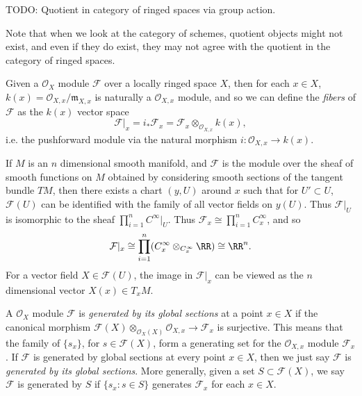 \begin{example}
    TODO: Quotient in category of ringed spaces via group action.
\end{example}

Note that when we look at the category of schemes, quotient objects might not exist, and even if they do exist, they may not agree with the quotient in the category of ringed spaces.

Given a $\mathcal{O}_X$ module $\mathcal{F}$ over a locally ringed space $X$, then for each $x \in X$, $k(x) = \mathcal{O}_{X,x} / \mathfrak{m}_{X,x}$ is naturally a $\mathcal{O}_{X,x}$ module, and so we can define the \emph{fibers} of $\mathcal{F}$ as the $k(x)$ vector space
%
\[ \mathcal{F}|_x = i_* \mathcal{F}_x = \mathcal{F}_x \otimes_{\mathcal{O}_{X,x}} k(x), \]
%
i.e. the pushforward module via the natural morphism $i: \mathcal{O}_{X,x} \to k(x)$.

\begin{example}
    If $M$ is an $n$ dimensional smooth manifold, and $\mathcal{F}$ is the module over the sheaf of smooth functions on $M$ obtained by considering smooth sections of the tangent bundle $TM$, then there exists a chart $(y,U)$ around $x$ such that for $U' \subset U$, $\mathcal{F}(U)$ can be identified with the family of all vector fields on $y(U)$. Thus $\mathcal{F}|_U$ is isomorphic to the sheaf $\prod_{i = 1}^n C^\infty|_U$. Thus $\mathcal{F}_x \cong \prod_{i = 1}^n C^\infty_x$, and so
    \[ \mathcal{F}|_x \cong \prod_{i = 1}^n (C^\infty_x \otimes_{C^\infty_x} \RR) \cong \RR^n. \]
    For a vector field $X \in \mathcal{F}(U)$, the image in $\mathcal{F}|_x$ can be viewed as the $n$ dimensional vector $X(x) \in T_x M$.
\end{example}

A $\mathcal{O}_X$ module $\mathcal{F}$ is \emph{generated by its global sections} at a point $x \in X$ if the canonical morphism $\mathcal{F}(X) \otimes_{\mathcal{O}_X(X)} \mathcal{O}_{X,x} \to \mathcal{F}_x$ is surjective. This means that the family of $\{ s_x \}$, for $s \in \mathcal{F}(X)$, form a generating set for the $\mathcal{O}_{X,x}$ module $\mathcal{F}_x$. If $\mathcal{F}$ is generated by global sections at every point $x \in X$, then we just say $\mathcal{F}$ is \emph{generated by its global sections}. More generally, given a set $S \subset \mathcal{F}(X)$, we say $\mathcal{F}$ is generated by $S$ if $\{ s_x : s \in S \}$ generates $\mathcal{F}_x$ for each $x \in X$.

